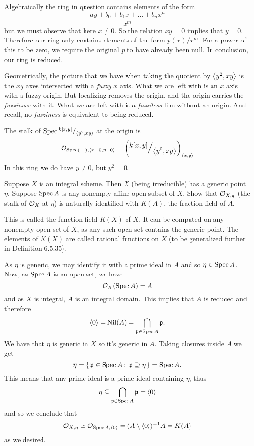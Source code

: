 \documentclass[12pt]{memoir}
\begin{document}
\begin{ptcbr}
Algebraically the ring in question contains elements of the form 
$$\frac{ay+b_0+b_1x+\dots+b_nx^n}{x^m}$$
but we must observe that here $x\neq 0$. So the relation $xy=0$ implies that $y=0$. Therefore our ring only contains elements of the form $p(x)/x^m$. For a power of this to be zero, we require the original $p$ to have already been null. In conclusion, our ring is reduced.\par 
Geometrically, the picture that we have when taking the quotient by $\left\langle y^2,xy\right\rangle$ is the $xy$ axes intersected with a \emph{fuzzy} $x$ axis. What we are left with is an $x$ axis with a fuzzy origin. But localizing removes the origin, and the origin carries the \emph{fuzziness} with it. What we are left with is a \emph{fuzziless} line without an origin. And recall, no \emph{fuzziness} is equivalent to being reduced.\par 
The stalk of $\Spec\quot{k[x,y]}{\genr{y^2,xy}}$ at the origin is 
$$\cO_{\Spec(\dots),\genr{x-0,y-0}}=\left(\quot{k[x,y]}{\genr{y^2,xy}}\right)_{\genr{x,y}}$$
In this ring we do have $y\neq 0$, but $y^2=0$.
\end{ptcbr}

\begin{Ej}[5.2.I Vakil]
    Suppose $X$ is an integral scheme. Then $X$ (being irreducible)
has a generic point $\eta$. Suppose $\operatorname{Spec} A$ is any nonempty affine open subset of $X$.
Show that $\mathcal{O}_{X,\eta}$ (the stalk of $\mathcal{O}_X$ at $\eta$) is naturally identified with $K(A)$, the fraction
field of $A$.\par This is called the function field $K(X)$ of $X$. It can be computed on any
nonempty open set of $X$, as any such open set contains the generic point. The
elements of $K(X)$ are called rational functions on $X$ (to be generalized further in
Definition 6.5.35).
\end{Ej}
\begin{ptcbr}
As $\eta$ is generic, we may identify it with a prime ideal in $A$ and so $\eta\in\operatorname{Spec} A$. Now, as $\operatorname{Spec} A$ is an open set, we have 
$$\mathcal{O}_X(\operatorname{Spec} A)=A$$
and as $X$ is integral, $A$ is an integral domain. This implies that $A$ is reduced and therefore 
$$\left\langle 0\right\rangle=\operatorname{Nil}(A)=\bigcap_{\mathfrak{p}\in\operatorname{Spec} A}\mathfrak{p}.$$
We have that $\eta$ is generic in $X$ so it's generic in $A$. Taking closures inside $A$ we get 
$$\ov\eta =\set{\lie p\in\Spec A\:\ \lie p\supseteq \eta}=\Spec A.$$
This means that any prime ideal is a prime ideal containing $\eta$, thus 
$$\eta\subseteq\bigcap_{\mathfrak{p}\in\operatorname{Spec} A}\mathfrak{p}=\left\langle 0\right\rangle$$
and so we conclude that 
$$\mathcal{O}_{X,\eta}\simeq\mathcal{O}_{\operatorname{Spec} A,\left\langle 0\right\rangle}=(A\setminus\left\langle 0\right\rangle)^{-1}A=K(A)$$
as we desired.  
\end{ptcbr}
\end{document}
